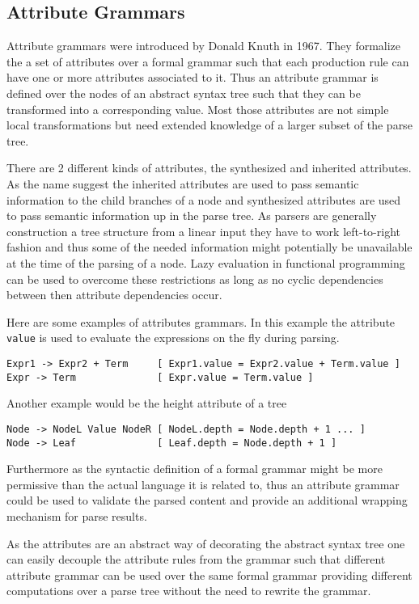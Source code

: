 \subsection{Attribute Grammars}
Attribute grammars were introduced by Donald Knuth in 1967. They formalize the a set of attributes over a formal grammar such that each production rule can have one or more attributes associated to it. Thus an attribute grammar is defined over the nodes of an abstract syntax tree such that they can be transformed into a corresponding value. Most those attributes are not simple local transformations but need extended knowledge of a larger subset of the parse tree.

There are 2 different kinds of attributes, the synthesized and inherited attributes. As the name suggest the inherited attributes are used to pass semantic information to the child branches of a node and synthesized attributes are used to pass semantic information up in the parse tree. As parsers are generally construction a tree structure from a linear input they have to work left-to-right fashion and thus some of the needed information might potentially be unavailable at the time of the parsing of a node. Lazy evaluation in functional programming can be used to overcome these restrictions as long as no cyclic dependencies between then attribute dependencies occur.

Here are some examples of attributes grammars.
In this example the attribute \verb/value/ is used to evaluate the expressions on the fly during parsing.
\begin{verbatim}
Expr1 -> Expr2 + Term     [ Expr1.value = Expr2.value + Term.value ]
Expr -> Term              [ Expr.value = Term.value ]
\end{verbatim}
Another example would be the height attribute of a tree
\begin{verbatim}
Node -> NodeL Value NodeR [ NodeL.depth = Node.depth + 1 ... ] 
Node -> Leaf              [ Leaf.depth = Node.depth + 1 ]
\end{verbatim}

Furthermore as the syntactic definition of a formal grammar might be more permissive than the actual language it is related to, thus an attribute grammar could be used to validate the parsed content and provide an additional wrapping mechanism for parse results. 

As the attributes are an abstract way of decorating the abstract syntax tree one can easily decouple the attribute rules from the grammar such that different attribute grammar can be used over the same formal grammar providing different computations over a parse tree without the need to rewrite the grammar.

